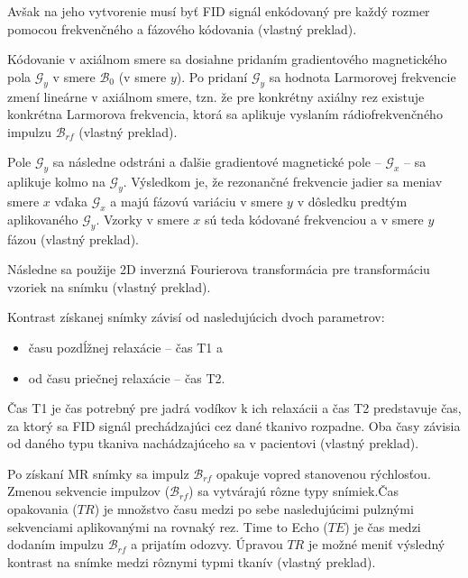 Avšak na jeho vytvorenie musí byť FID signál enkódovaný pre každý rozmer pomocou frekvenčného a fázového kódovania \cite{basic_principles_of_mri} (vlastný preklad).

Kódovanie v axiálnom smere sa dosiahne pridaním gradientového magnetického pola $\mathcal{G}_{y}$ v smere $\mathcal{B}_{0}$ (v smere $y$). Po pridaní $\mathcal{G}_{y}$ sa hodnota Larmorovej frekvencie zmení lineárne v axiálnom smere, tzn. že pre konkrétny axiálny rez existuje konkrétna Larmorova frekvencia, ktorá sa aplikuje vyslaním rádiofrekvenčného impulzu $\mathcal{B}_{rf}$ \cite{basic_principles_of_mri} (vlastný preklad).

Pole $\mathcal{G}_{y}$ sa následne odstráni a ďalšie gradientové magnetické pole -- $\mathcal{G}_{x}$ -- sa aplikuje kolmo na $\mathcal{G}_{y}$. Výsledkom je, že rezonančné frekvencie jadier sa menia\newline v smere $x$ vďaka $\mathcal{G}_{x}$ a majú fázovú variáciu v smere $y$ v dôsledku predtým aplikovaného $\mathcal{G}_{y}$. Vzorky v smere $x$ sú teda kódované frekvenciou a v smere $y$ fázou \cite{basic_principles_of_mri} (vlastný preklad).

Následne sa použije 2D inverzná Fourierova transformácia pre transformáciu vzoriek na snímku \cite{basic_principles_of_mri} (vlastný preklad).\clearpage

Kontrast získanej snímky závisí od nasledujúcich dvoch parametrov:

\begin {itemize}
\item {času pozdĺžnej relaxácie -- čas T1 a}
\item {od času priečnej relaxácie -- čas T2.}
\end {itemize}

Čas T1 je čas potrebný pre jadrá vodíkov k ich relaxácii a čas T2 predstavuje čas, za ktorý sa FID signál prechádzajúci cez dané tkanivo rozpadne. \newline Oba časy závisia od daného typu tkaniva nachádzajúceho sa v pacientovi \cite{basic_principles_of_mri} (vlastný preklad).

Po získaní MR snímky sa impulz $\mathcal{B}_{rf}$ opakuje vopred stanovenou rýchlosťou. Zmenou sekvencie impulzov ($\mathcal{B}_{rf}$) sa vytvárajú rôzne typy snímiek.\newline Čas opakovania ($TR$) je množstvo času medzi po sebe nasledujúcimi pulznými sekvenciami aplikovanými na rovnaký rez. Time to Echo ($TE$) je čas medzi dodaním impulzu $\mathcal{B}_{rf}$ a prijatím odozvy. Úpravou $TR$ je možné meniť výsledný kontrast na snímke medzi rôznymi typmi tkanív \cite{basic_principles_of_mri} (vlastný preklad).


